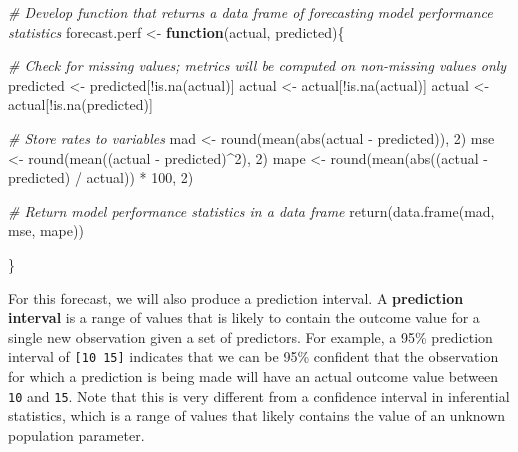 \documentclass[
]{book}
\newenvironment{Shaded}{\begin{snugshade}}{\end{snugshade}}
\newcommand{\CommentTok}[1]{\textcolor[rgb]{0.56,0.35,0.01}{\textit{#1}}}
\newcommand{\ControlFlowTok}[1]{\textcolor[rgb]{0.13,0.29,0.53}{\textbf{#1}}}
\newcommand{\DecValTok}[1]{\textcolor[rgb]{0.00,0.00,0.81}{#1}}
\newcommand{\FunctionTok}[1]{\textcolor[rgb]{0.00,0.00,0.00}{#1}}
\newcommand{\NormalTok}[1]{#1}
\newcommand{\OtherTok}[1]{\textcolor[rgb]{0.56,0.35,0.01}{#1}}
\newcommand{\SpecialCharTok}[1]{\textcolor[rgb]{0.00,0.00,0.00}{#1}}
\begin{document}
\begin{Shaded}
\begin{Highlighting}[]
\CommentTok{\# Develop function that returns a data frame of forecasting model performance statistics}
\NormalTok{forecast.perf }\OtherTok{\textless{}{-}} \ControlFlowTok{function}\NormalTok{(actual, predicted)\{}
  
  \CommentTok{\# Check for missing values; metrics will be computed on non{-}missing values only}
\NormalTok{  predicted }\OtherTok{\textless{}{-}}\NormalTok{ predicted[}\SpecialCharTok{!}\FunctionTok{is.na}\NormalTok{(actual)]}
\NormalTok{  actual }\OtherTok{\textless{}{-}}\NormalTok{ actual[}\SpecialCharTok{!}\FunctionTok{is.na}\NormalTok{(actual)]}
\NormalTok{  actual }\OtherTok{\textless{}{-}}\NormalTok{ actual[}\SpecialCharTok{!}\FunctionTok{is.na}\NormalTok{(predicted)]}
  
  \CommentTok{\# Store rates to variables}
\NormalTok{  mad }\OtherTok{\textless{}{-}} \FunctionTok{round}\NormalTok{(}\FunctionTok{mean}\NormalTok{(}\FunctionTok{abs}\NormalTok{(actual }\SpecialCharTok{{-}}\NormalTok{ predicted)), }\DecValTok{2}\NormalTok{)}
\NormalTok{  mse }\OtherTok{\textless{}{-}} \FunctionTok{round}\NormalTok{(}\FunctionTok{mean}\NormalTok{((actual }\SpecialCharTok{{-}}\NormalTok{ predicted)}\SpecialCharTok{\^{}}\DecValTok{2}\NormalTok{), }\DecValTok{2}\NormalTok{)}
\NormalTok{  mape }\OtherTok{\textless{}{-}} \FunctionTok{round}\NormalTok{(}\FunctionTok{mean}\NormalTok{(}\FunctionTok{abs}\NormalTok{((actual }\SpecialCharTok{{-}}\NormalTok{ predicted) }\SpecialCharTok{/}\NormalTok{ actual)) }\SpecialCharTok{*} \DecValTok{100}\NormalTok{, }\DecValTok{2}\NormalTok{)}
  
  \CommentTok{\# Return model performance statistics in a data frame}
  \FunctionTok{return}\NormalTok{(}\FunctionTok{data.frame}\NormalTok{(mad, mse, mape))}
  
\NormalTok{\}}
\end{Highlighting}
\end{Shaded}

For this forecast, we will also produce a prediction interval. A \textbf{prediction interval} is a range of values that is likely to contain the outcome value for a single new observation given a set of predictors. For example, a 95\% prediction interval of \texttt{{[}10\ 15{]}} indicates that we can be 95\% confident that the observation for which a prediction is being made will have an actual outcome value between \texttt{10} and \texttt{15}. Note that this is very different from a confidence interval in inferential statistics, which is a range of values that likely contains the value of an unknown population parameter.
\end{document}

